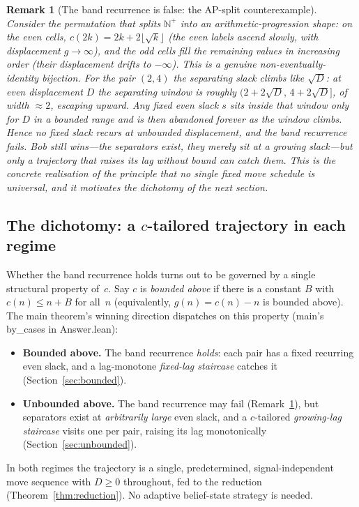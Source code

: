\documentclass{article}
\newtheorem{remark}[theorem]{Remark}
\newcommand{\Np}{\mathbb{N}^{+}}
\newcommand{\us}{\discretionary{}{}{}\_\discretionary{}{}{}}
\newcommand{\dt}{.\discretionary{}{}{}}
\newcommand{\lean}[1]{{\small\ttfamily #1}}
\begin{document}
\begin{remark}[The band recurrence is false: the AP-split counterexample]
\label{rem:apsplit}
Consider the permutation that splits $\Np$ into an arithmetic-progression
shape: on the even cells, $c(2k) = 2k + 2\lfloor\sqrt{k}\rfloor$ (the even
labels ascend slowly, with displacement $g\to\infty$), and the odd cells
fill the remaining values in increasing order (their displacement drifts
to $-\infty$). This is a genuine non-eventually-identity bijection. For
the pair $(2,4)$ the separating slack \emph{climbs} like $\sqrt{D}$: at
even displacement $D$ the separating window is roughly
$(2+2\sqrt{D},\,4+2\sqrt{D}]$, of width $\approx 2$, escaping upward. Any
fixed even slack $s$ sits inside that window only for $D$ in a bounded
range and is then abandoned forever as the window climbs. Hence \emph{no}
fixed slack recurs at unbounded displacement, and the band recurrence
fails. Bob still wins---the separators exist, they merely sit at a
\emph{growing} slack---but only a trajectory that raises its lag without
bound can catch them. This is the concrete realisation of the principle
that no single fixed move schedule is universal, and it motivates the
dichotomy of the next section.
\end{remark}

\subsection{The dichotomy: a \texorpdfstring{$c$}{c}-tailored trajectory in each regime}
\label{sec:dichotomy}

Whether the band recurrence holds turns out to be governed by a single
structural property of~$c$. Say $c$ is \emph{bounded above} if there is a
constant $B$ with $c(n)\le n+B$ for all~$n$ (equivalently, $g(n)=c(n)-n$
is bounded above). The main theorem's winning direction dispatches on
this property (\lean{main}'s \lean{by\us cases} in \lean{Answer\dt lean}):
\begin{itemize}[topsep=3pt,itemsep=4pt,leftmargin=*]
  \item \textbf{Bounded above.} The band recurrence \emph{holds}: each
  pair has a fixed recurring even slack, and a lag-monotone
  \emph{fixed-lag staircase} catches it (Section~\ref{sec:bounded}).
  \item \textbf{Unbounded above.} The band recurrence may fail
  (Remark~\ref{rem:apsplit}), but separators exist at \emph{arbitrarily
  large} even slack, and a $c$-tailored \emph{growing-lag staircase}
  visits one per pair, raising its lag monotonically
  (Section~\ref{sec:unbounded}).
\end{itemize}
In both regimes the trajectory is a single, predetermined,
signal-independent move sequence with $D\ge 0$ throughout, fed to the
reduction (Theorem~\ref{thm:reduction}). No adaptive belief-state
strategy is needed.
\end{document}
